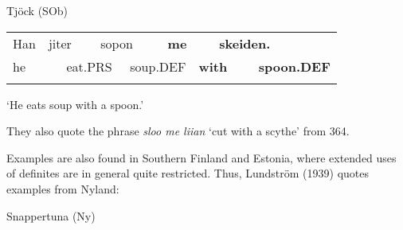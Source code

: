\begin{styleExLtrTblii}
Tjöck (SOb)

\end{styleExLtrTblii}

\begin{tabular}{llllllllll}
\lsptoprule
Han & \multicolumn{2}{l}{jiter

} & \multicolumn{2}{l}{sopon

} & \multicolumn{2}{l}{{\bfseries me}

} & \multicolumn{2}{l}{{\bfseries skeiden.}

} & \\
\multicolumn{2}{l}{he

} & \multicolumn{2}{l}{eat.PRS

} & \multicolumn{2}{l}{soup.DEF

} & \multicolumn{2}{l}{{\bfseries with}

} & \multicolumn{2}{l}{{\bfseries spoon.DEF}

}\\
\lspbottomrule
\end{tabular}

\begin{styleTranslation}
‘He eats soup with a spoon.’

\end{styleTranslation}

\begin{styleBodyTextFirst}
They also quote the phrase \textit{sloo me liian} ‘cut with a scythe’ from 364. 

\end{styleBodyTextFirst}

\begin{styleBodytextC}
Examples are also found in Southern Finland and Estonia, where extended uses of definites are in general quite restricted. Thus, Lundström (1939) quotes examples from Nyland:

\end{styleBodytextC}


\begin{listWWNumileveli}
\item 

\begin{styleExample}
Snappertuna (Ny) 

\end{styleExample}

\end{listWWNumileveli}

